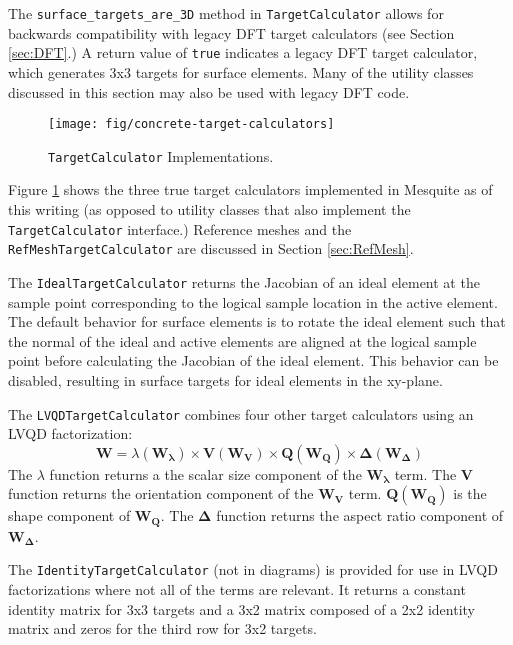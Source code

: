 \documentclass{article}
\begin{document}
The \texttt{surface\_targets\_are\_3D} method in \texttt{TargetCalculator} allows for backwards compatibility with legacy DFT target calculators (see Section \ref{sec:DFT}.)  A return value of \texttt{true} indicates a legacy DFT target calculator, which generates 3x3 targets for surface elements.  Many of the utility classes discussed in this section may also be used with legacy DFT code.

\begin{figure}[htb]
\begin{center}
\texttt{[image: fig/concrete-target-calculators]}
\caption{\texttt{TargetCalculator} Implementations.\label{fig:target-concrete}}
\end{center}
\end{figure}

Figure \ref{fig:target-concrete} shows the three true target calculators implemented in Mesquite as of this writing (as opposed to utility classes that also implement the \texttt{TargetCalculator} interface.)  Reference meshes and the \texttt{RefMeshTargetCalculator} are discussed in Section \ref{sec:RefMesh}.

The \texttt{IdealTargetCalculator} returns the Jacobian of an ideal element at the sample point corresponding to the logical sample location in the active element.  The default behavior for surface elements is to rotate the ideal element such that the normal of the ideal and active elements are aligned at the logical sample point before calculating the Jacobian of the ideal element.  This behavior can be disabled, resulting in surface targets for ideal elements in the xy-plane.

The \texttt{LVQDTargetCalculator} combines four other target calculators using an LVQD factorization:
\begin{displaymath}
\mathbf{W} = \lambda(\mathbf{W_\lambda}) \times \mathbf{V}(\mathbf{W_V}) \times \mathbf{Q}(\mathbf{W_Q}) \times \mathbf{\Delta}(\mathbf{W_\Delta}) 
\end{displaymath}
The $\lambda$ function returns a the scalar size component of the $\mathbf{W_\lambda}$ term.  The $\mathbf{V}$ function returns the orientation component of the $\mathbf{W_V}$ term.  $\mathbf{Q}(\mathbf{W_Q})$ is the shape component of $\mathbf{W_Q}$.  The $\mathbf{\Delta}$ function returns the aspect ratio component of $\mathbf{W_\Delta}$.  

The \texttt{IdentityTargetCalculator} (not in diagrams) is provided for use in LVQD factorizations where not all of the terms are relevant.  It returns a constant identity matrix for 3x3 targets and a 3x2 matrix composed of a 2x2 identity matrix and zeros for the third row for 3x2 targets.
\end{document}
